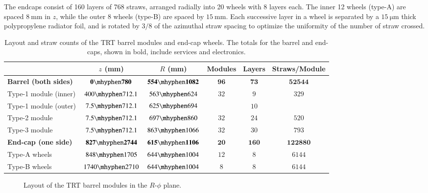 The endcaps consist of 160 layers of 768 straws, arranged radially into 20 wheels with 8 layers each. The inner 12 wheels (type-A) are spaced $\SI{8}{\milli\meter}$ in $z$, while the outer 8 wheels (type-B) are spaced by $\SI{15}{\milli\meter}$. Each successive layer in a wheel is separated by a $\SI{15}{\micro\meter}$ thick polypropylene radiator foil, and is rotated by $3/8$ of the azimuthal straw spacing to optimize the uniformity of the number of straw crossed.


\begin{table}[htbp]
	\centering
	\begin{tabular}{|l|c|c|c|c|c|}
		\hline
		 & $z$ (mm) & $R$ (mm) & Modules & Layers & Straws/Module \\
		 \hline
		 \textbf{Barrel (both sides)} & $\mathbf{0\mhyphen780}$ & $\mathbf{554\mhyphen1082}$ & $\mathbf{96}$ & $\mathbf{73}$ & $\mathbf{52544}$ \\
		 Type-1 module (inner) & $400\mhyphen712.1$ & $563\mhyphen624$ & \multirow{2}{*}{$32$} & $9$ & \multirow{2}{*}{$329$} \\
		 Type-1 module (outer) & $7.5\mhyphen712.1$ & $625\mhyphen 694$ & & $10$ & \\
		 Type-2 module & $7.5\mhyphen 712.1$ & $697\mhyphen860$ & $32$ & $24$ & $520$ \\
		 Type-3 module & $7.5\mhyphen 712.1$ & $863\mhyphen 1066$ & $32$ & $30$ & $793$ \\
		 \hline
		 \textbf{End-cap (one side)} & $\mathbf{827\mhyphen 2744}$ & $\mathbf{615\mhyphen1106}$ & $\mathbf{20}$ & $\mathbf{160}$ & $\mathbf{122880}$ \\
		 Type-A wheels & $848\mhyphen1705$ & $644\mhyphen1004$ & $12$ & $8$ & $6144$ \\
		 Type-B wheels & $1740\mhyphen2710$ & $644\mhyphen1004$ & $8$ & $8$ & $6144$ \\
		 \hline
	\end{tabular}
	\caption{Layout and straw counts of the TRT barrel modules and end-cap wheels. The totals for the barrel and end-caps, shown in bold, include services and electronics.}	
	\label{table:ATLAS-TRT-layout}
\end{table}

\begin{figure}[htbp]
	\centering
	\caption{Layout of the TRT barrel modules in the $R$-$\phi$ plane.}
	\label{fig:ATLAS-TRT-barrel-modules}
\end{figure}



